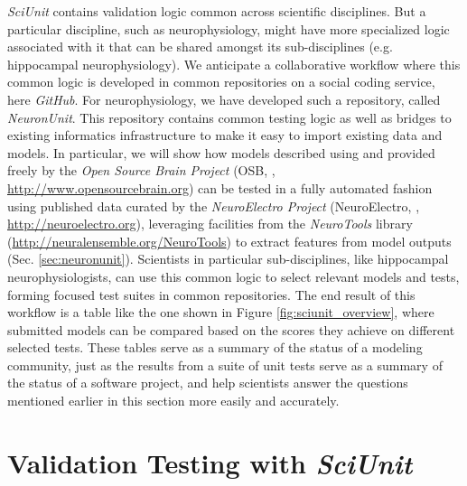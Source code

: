 \documentclass{frontiersSCNS}
\begin{document}
\textit{SciUnit} contains validation logic common across scientific disciplines.
But a particular discipline, such as neurophysiology, might have more specialized logic associated with it that can be shared amongst its sub-disciplines (e.g. hippocampal neurophysiology). 
We anticipate a collaborative workflow where this common logic is developed in common repositories on a social coding service, here \textit{GitHub}. 
For neurophysiology, we have developed such a repository, called \textit{NeuronUnit}. 
This repository contains common testing logic as well as bridges to existing informatics infrastructure to make it easy to import existing data and models. 
In particular, we will show how models described using  and provided freely by the \textit{Open Source Brain Project} (OSB, \cite{gleeson_open_2012}, \url{http://www.opensourcebrain.org}) can be tested in a fully automated fashion using published data curated by the \textit{NeuroElectro Project} (NeuroElectro, \cite{tripathy_neuroelectro:_2012}, \url{http://neuroelectro.org}), leveraging facilities from the \textit{NeuroTools} library (\url{http://neuralensemble.org/NeuroTools}) to extract features from model outputs (Sec. \ref{sec:neuronunit}). 
Scientists in particular sub-disciplines, like hippocampal neurophysiologists, can use this common logic to select relevant models and tests, forming focused test suites in common repositories. 
The end result of this workflow is a table like the one shown in Figure \ref{fig:sciunit_overview}, where submitted models can be compared based on the scores they achieve on different selected tests. 
These tables serve as a summary of the status of a modeling community, just as the results from a suite of unit tests serve as a summary of the status of a software project, and help scientists answer the questions mentioned earlier in this section more easily and accurately.

\section{Validation Testing with \textit{SciUnit}}\label{sec:sciunit}
\end{document}
